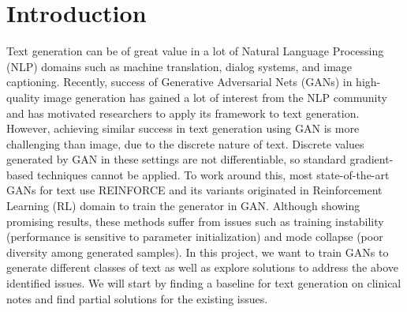 \documentclass[12pt]{report}
\begin{document}
\section*{Introduction}
Text generation can be of great value in a lot of Natural Language Processing (NLP) domains such as machine translation, dialog systems, and image captioning. Recently, success of Generative Adversarial Nets (GANs)\cite{NIPS2014_5423} in high-quality image generation has gained a lot of interest from the NLP community and has motivated researchers to apply its framework to text generation. However, achieving similar success in text generation using GAN is more challenging than image, due to the discrete nature of text. Discrete values generated by GAN in these settings are not differentiable, so standard gradient-based techniques cannot be applied. To work around this, most state-of-the-art GANs for text use REINFORCE\cite{Williams:1992:SSG:139611.139614} and its variants originated in Reinforcement Learning (RL) domain to train the generator in GAN. Although showing promising results, these methods suffer from issues such as training instability (performance is sensitive to parameter initialization) and mode collapse (poor diversity among generated samples). In this project, we want to train GANs to generate different classes of text as well as explore solutions to address the above identified issues. We will start by finding a baseline for text generation on clinical notes and find partial solutions for the existing issues.

\end{document}
